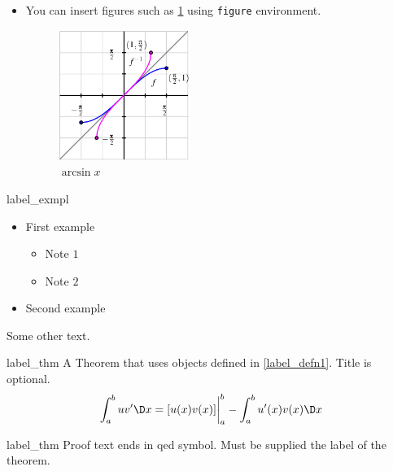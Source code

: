 \documentclass{worksheet}
\begin{document}
\begin{itemize}
    \item 
    You can insert figures such as \cref{fig:arcsin} using {\tt figure} environment.
    \begin{figure}[!ht] %
        \centering
        \includegraphics[width=0.4\textwidth]{images/picture.png}
        \caption{$\arcsin x$}
        \label{fig:arcsin}
    \end{figure}
    
    \end{itemize}
   
	
	
	
	\begin{exmpl}[Title]{label_exmpl}
	 \begin{itemize}
        \item First example 
        \begin{itemize}
            \item  Note $1$
            \item  Note $2$
        \end{itemize}
        \item Second example
    \end{itemize}
	\end{exmpl}    


    
	Some other text.
	
	\begin{theo}{label_thm}
	A Theorem that uses objects defined in \cref{label_defn1}. Title is optional. 
	\[\dint_a^b u v' \dx = [u(x)v(x)] \eval_a^b - \dint_a^b u'(x) v(x) \dx\]
	\end{theo}
	
    
    \begin{prf}{label_thm}
    Proof text ends in qed symbol. Must be supplied the label of the theorem.
    \end{prf}
    
\end{document}
